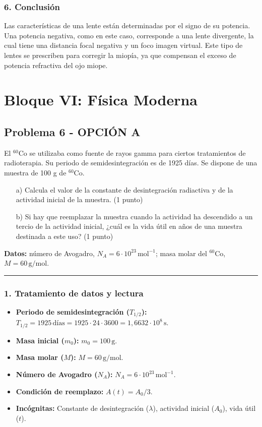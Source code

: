 \subsubsection*{6. Conclusión}
\begin{cajaconclusion}
Las características de una lente están determinadas por el signo de su potencia. Una potencia negativa, como en este caso, corresponde a una lente divergente, la cual tiene una distancia focal negativa y un foco imagen virtual. Este tipo de lentes se prescriben para corregir la miopía, ya que compensan el exceso de potencia refractiva del ojo miope.
\end{cajaconclusion}
\newpage

\section{Bloque VI: Física Moderna}
\label{sec:mod_2019_jun_ord}

\subsection{Problema 6 - OPCIÓN A}
\label{subsec:6A_2019_jun_ord}
\begin{cajaenunciado}
El $^{60}\text{Co}$ se utilizaba como fuente de rayos gamma para ciertos tratamientos de radioterapia. Su periodo de semidesintegración es de 1925 días. Se dispone de una muestra de 100 g de $^{60}\text{Co}$.
\begin{enumerate}
    \item[a)] Calcula el valor de la constante de desintegración radiactiva y de la actividad inicial de la muestra. (1 punto)
    \item[b)] Si hay que reemplazar la muestra cuando la actividad ha descendido a un tercio de la actividad inicial, ¿cuál es la vida útil en años de una muestra destinada a este uso? (1 punto)
\end{enumerate}
\textbf{Datos:} número de Avogadro, $N_{A}=6\cdot10^{23}\,\text{mol}^{-1}$; masa molar del $^{60}\text{Co}$, $M=60\,\text{g/mol}$.
\end{cajaenunciado}
\hrule
\subsubsection*{1. Tratamiento de datos y lectura}
\begin{itemize}
    \item \textbf{Periodo de semidesintegración ($T_{1/2}$):} $T_{1/2} = 1925\,\text{días} = 1925 \cdot 24 \cdot 3600 = 1,6632\cdot10^8\,\text{s}$.
    \item \textbf{Masa inicial ($m_0$):} $m_0 = 100\,\text{g}$.
    \item \textbf{Masa molar ($M$):} $M = 60\,\text{g/mol}$.
    \item \textbf{Número de Avogadro ($N_A$):} $N_A = 6\cdot10^{23}\,\text{mol}^{-1}$.
    \item \textbf{Condición de reemplazo:} $A(t) = A_0/3$.
    \item \textbf{Incógnitas:} Constante de desintegración ($\lambda$), actividad inicial ($A_0$), vida útil ($t$).
\end{itemize}

